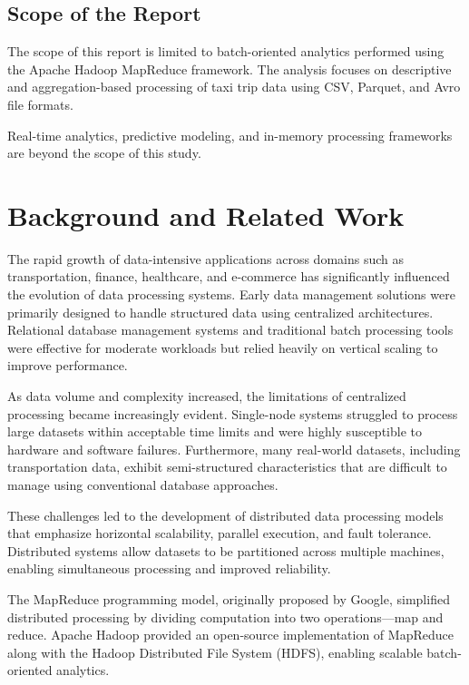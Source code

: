 \documentclass[12pt,a4paper]{report}
\begin{document}
\subsection{Scope of the Report}

The scope of this report is limited to batch-oriented analytics performed using the
Apache Hadoop MapReduce framework. The analysis focuses on descriptive and
aggregation-based processing of taxi trip data using CSV, Parquet, and Avro file formats.

Real-time analytics, predictive modeling, and in-memory processing frameworks are
beyond the scope of this study.


\clearpage
\section{Background and Related Work}

The rapid growth of data-intensive applications across domains such as transportation,
finance, healthcare, and e-commerce has significantly influenced the evolution of data
processing systems. Early data management solutions were primarily designed to handle
structured data using centralized architectures. Relational database management systems
and traditional batch processing tools were effective for moderate workloads but relied
heavily on vertical scaling to improve performance.

As data volume and complexity increased, the limitations of centralized processing
became increasingly evident. Single-node systems struggled to process large datasets
within acceptable time limits and were highly susceptible to hardware and software
failures. Furthermore, many real-world datasets, including transportation data, exhibit
semi-structured characteristics that are difficult to manage using conventional database
approaches.

These challenges led to the development of distributed data processing models that
emphasize horizontal scalability, parallel execution, and fault tolerance. Distributed
systems allow datasets to be partitioned across multiple machines, enabling simultaneous
processing and improved reliability.

The MapReduce programming model, originally proposed by Google, simplified distributed
processing by dividing computation into two operations—map and reduce. Apache Hadoop
provided an open-source implementation of MapReduce along with the Hadoop
Distributed File System (HDFS), enabling scalable batch-oriented analytics.
\end{document}
